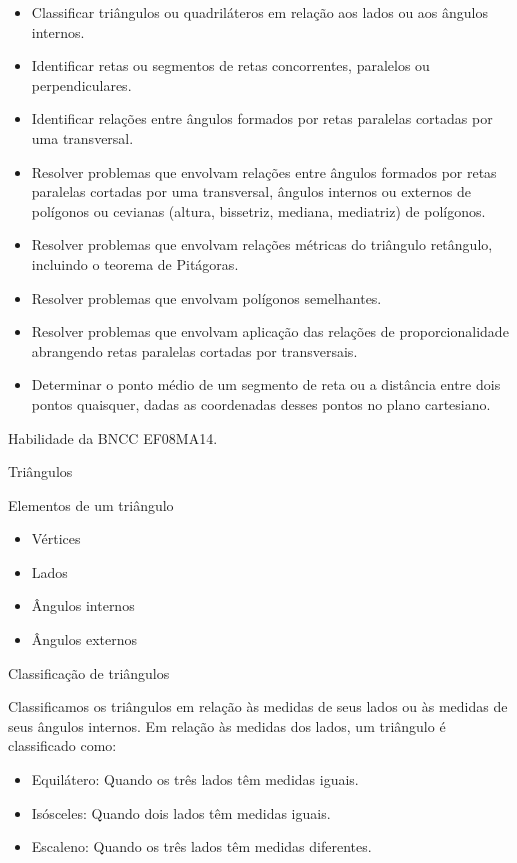 {\begin{itemize}
\item
  Classificar triângulos ou quadriláteros em relação aos lados ou aos
  ângulos internos.
\item
  Identificar retas ou segmentos de retas concorrentes, paralelos ou
  perpendiculares.
\item
  Identificar relações entre ângulos formados por retas paralelas
  cortadas por uma transversal.
\item
  Resolver problemas que envolvam relações entre ângulos formados por
  retas paralelas cortadas por uma transversal, ângulos internos ou
  externos de polígonos ou cevianas (altura, bissetriz, mediana,
  mediatriz) de polígonos.
\item
  Resolver problemas que envolvam relações métricas do triângulo
  retângulo, incluindo o teorema de Pitágoras.
\item
  Resolver problemas que envolvam polígonos semelhantes.
\item
  Resolver problemas que envolvam aplicação das relações de
  proporcionalidade abrangendo retas paralelas cortadas por
  transversais.
\item
  Determinar o ponto médio de um segmento de reta ou a distância entre
  dois pontos quaisquer, dadas as coordenadas desses pontos no plano
  cartesiano.
\end{itemize}

Habilidade da BNCC EF08MA14.

Triângulos

Elementos de um triângulo

\begin{itemize}
\item
  Vértices
\item
  Lados
\item
  Ângulos internos
\item
  Ângulos externos
\end{itemize}

Classificação de triângulos

Classificamos os triângulos em relação às medidas de seus lados ou às
medidas de seus ângulos internos. Em relação às medidas dos lados, um
triângulo é classificado como:

\begin{itemize}
\item
  Equilátero: Quando os três lados têm medidas iguais.
\item
  Isósceles: Quando dois lados têm medidas iguais.
\item
  Escaleno: Quando os três lados têm medidas diferentes.
\end{itemize}

}
